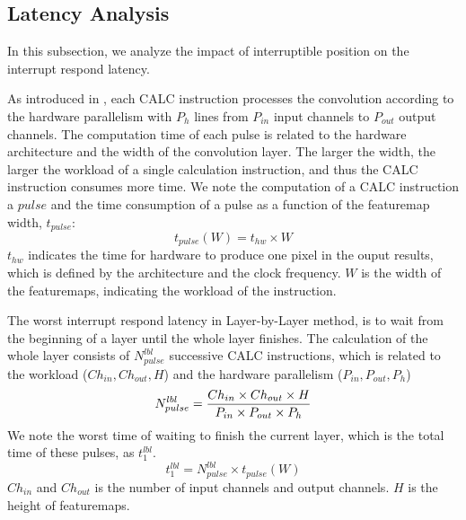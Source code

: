 \subsection {Latency Analysis}
In this subsection, we analyze the impact of interruptible position on the interrupt respond latency.

As introduced in , each CALC instruction processes the convolution according to the hardware parallelism with $P_{h}$ lines from $ P_{in} $ input channels to $ P_{out}$ output channels. 
The computation time of each pulse is related to the hardware architecture and the width of the convolution layer. 
The larger the width, the larger the workload of a single calculation instruction, and thus the CALC instruction consumes more time. 
We note the computation of a CALC instruction a $pulse$ and the time consumption of a pulse as a function of the featuremap width, $t_{pulse}$:
\begin{equation}
	t_{pulse}(W) = t_{hw} \times W
\end{equation}
$t_{hw}$ indicates the time for hardware to produce one pixel in the ouput results, which is defined by the architecture and the clock frequency.
$W$ is the width of the featuremaps, indicating the workload of the instruction.


The worst interrupt respond latency in Layer-by-Layer method, is to wait from the beginning of a layer until the whole layer finishes.
The calculation of the whole layer consists of $N_{pulse}^{lbl}$ successive CALC instructions, which is related to the workload ($Ch_{in},Ch_{out},H$) and the hardware parallelism ($P_{in},P_{out},P_{h}$)
\begin{equation}
	\small
	N_{pulse}^{lbl} = \frac{ Ch_{in} \times Ch_{out} \times H }{ P_{in} \times P_{out} \times P_{h} } 
\end{equation}
We note the worst time of waiting to finish the current layer, which is the total time of these pulses, as $t_{1}^{lbl}$.
\begin{equation}
t_{1}^{lbl} = N_{pulse}^{lbl} \times t_{pulse}(W)
\end{equation}
$Ch_{in}$ and $Ch_{out}$ is the number of input channels and output channels. $H$ is the height of featuremaps.

